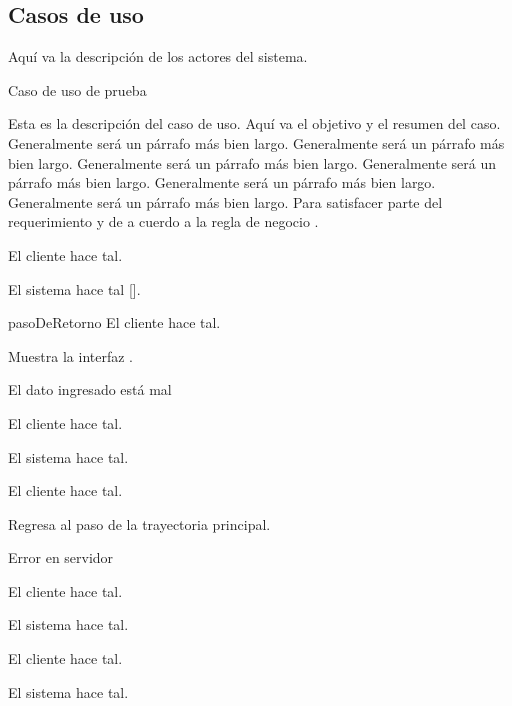 %
%
%

\subsection{Casos de uso}

Aquí va la descripción de los actores del sistema.

\newpage
{}                       %
{Caso de uso de prueba}     %
{
  Esta es la descripción del caso de uso. Aquí va el objetivo y el resumen del
  caso. Generalmente será un párrafo más bien largo. Generalmente será un
  párrafo más bien largo. Generalmente será un párrafo más bien largo.
  Generalmente será un párrafo más bien largo. Generalmente será un párrafo más
  bien largo. Generalmente será un párrafo más bien largo. Para satisfacer parte
  del requerimiento  y de a cuerdo a la regla de
  negocio .

  \begin{trayectoriaPrincipal}
    \item El cliente hace tal.
    \item El sistema hace tal [].
    \item[pasoDeRetorno] El cliente hace tal.
    \item Muestra la interfaz .
  \end{trayectoriaPrincipal}

  \begin{trayectoriaAlternativa}[ta:errorEnTal]  %
    {El dato ingresado está mal}                 %
    \item El cliente hace tal.
    \item El sistema hace tal.
    \item El cliente hace tal.
    \item Regresa al paso  de la trayectoria
      principal.
  \end{trayectoriaAlternativa}

  \begin{trayectoriaAlternativa}[ta:errorEnTalDOS]
    {Error en servidor}
    \item El cliente hace tal.
    \item El sistema hace tal.
    \item El cliente hace tal.
    \item El sistema hace tal.
  \end{trayectoriaAlternativa}
}

